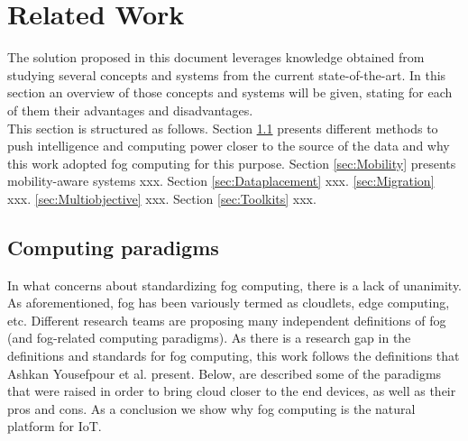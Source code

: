 \vfill
\pagebreak
\section{Related Work}
\label{sec:RelatedWork}

The solution proposed in this document leverages knowledge obtained from
studying several concepts and systems from the current state-of-the-art. In this
section an overview of those concepts and systems will be given, stating for
each of them their advantages and disadvantages.\\
This section is structured as follows. Section \ref{sec:Computingparadigms} presents different methods to push intelligence and computing power closer to the source of the data and why this work adopted fog computing for this purpose. Section \ref{sec:Mobility} presents
mobility-aware systems xxx. Section \ref{sec:Dataplacement} xxx. \ref{sec:Migration} xxx. \ref{sec:Multiobjective} xxx. Section \ref{sec:Toolkits} xxx.

\subsection{Computing paradigms}
\label{sec:Computingparadigms}
In what concerns about standardizing fog computing, there is a lack of unanimity. As aforementioned, fog has been variously termed as cloudlets, edge computing, etc. Different research teams are proposing many independent definitions of fog (and fog-related computing paradigms). As there is a research gap in the definitions and standards for fog computing, this work follows the definitions that Ashkan Yousefpour et al. \cite{yousefpour2018all} present. Below, are described some of the paradigms that were raised in order to bring cloud closer to the end devices, as well as their pros and cons. As a conclusion we show why fog computing is the natural platform for IoT.

